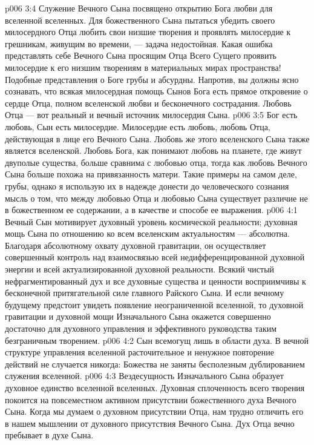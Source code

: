 \vs p006 3:4 Служение Вечного Сына посвящено открытию Бога любви для вселенной вселенных. Для божественного Сына пытаться убедить своего милосердного Отца любить свои низшие творения и проявлять милосердие к грешникам, живущим во времени, --- задача недостойная. Какая ошибка представлять себе Вечного Сына просящим Отца Всего Сущего проявить милосердие к его низшим творениям в материальных мирах пространства! Подобные представления о Боге грубы и абсурдны. Напротив, вы должны ясно сознавать, что всякая милосердная помощь Сынов Бога есть прямое откровение о сердце Отца, полном вселенской любви и бесконечного сострадания. Любовь Отца --- вот реальный и вечный источник милосердия Сына.
\vs p006 3:5 Бог есть любовь, Сын есть милосердие. Милосердие есть любовь, любовь Отца, действующая в лице его Вечного Сына. Любовь же этого вселенского Сына также является вселенской. Любовь Бога, как понимают любовь на планете, где живут двуполые существа, больше сравнима с любовью отца, тогда как любовь Вечного Сына больше похожа на привязанность матери. Такие примеры на самом деле, грубы, однако я использую их в надежде донести до человеческого сознания мысль о том, что между любовью Отца и любовью Сына существует различие не в божественном ее содержании, а в качестве и способе ее выражения.
\vs p006 4:1 Вечный Сын мотивирует духовный уровень космической реальности; духовная мощь Сына по отношению ко всем вселенским актуальностям --- абсолютна. Благодаря абсолютному охвату духовной гравитации, он осуществляет совершенный контроль над взаимосвязью всей недифференцированной духовной энергии и всей актуализированной духовной реальности. Всякий чистый нефрагментированный дух и все духовные существа и ценности восприимчивы к бесконечной притягательной силе главного Райского Сына. И если вечному будущему предстоит увидеть появление неограниченной вселенной, то духовной гравитации и духовной мощи Изначального Сына окажется совершенно достаточно для духовного управления и эффективного руководства таким безграничным творением.
\vs p006 4:2 \pc Сын всемогущ лишь в области духа. В вечной структуре управления вселенной расточительное и ненужное повторение действий не случается никогда: Божества не заняты бесполезным дублированием служения вселенной.
\vs p006 4:3 \pc Вездесущность Изначального Сына образует духовное единство вселенной вселенных. Духовная сплоченность всего творения покоится на повсеместном активном присутствии божественного духа Вечного Сына. Когда мы думаем о духовном присутствии Отца, нам трудно отличить его в нашем мышлении от духовного присутствия Вечного Сына. Дух Отца вечно пребывает в духе Сына.
